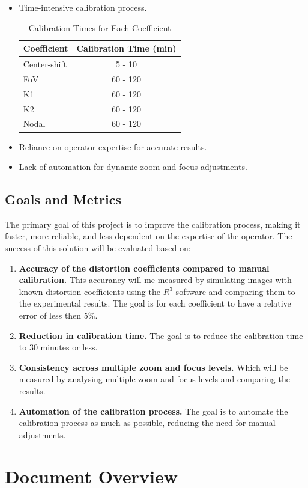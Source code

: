 \begin{itemize}
    \item Time-intensive calibration process.
    

    \begin{table}[h]
        \centering
        \begin{tabular}{|l|c|}
            \hline
            \textbf{Coefficient} & \textbf{Calibration Time (min)} \\ \hline
            Center-shift & 5 - 10 \\ \hline
            FoV & 60 - 120 \\ \hline
            K1 & 60 - 120 \\ \hline
            K2 & 60 - 120 \\ \hline
            Nodal & 60 - 120 \\ \hline
        \end{tabular}
        \caption{Calibration Times for Each Coefficient}
        \label{tab:calibration_times}
    \end{table}

    \item Reliance on operator expertise for accurate results.
    \item Lack of automation for dynamic zoom and focus adjustments.
\end{itemize}

\subsection{Goals and Metrics}

\noindent The primary goal of this project is to improve the calibration process, making it faster, more reliable, and less dependent on the expertise of the operator. The success of this solution will be evaluated based on:

\begin{enumerate}
    \item \textbf{Accuracy of the distortion coefficients compared to manual calibration.} This accurancy will me measured by simulating images with known distortion coefficients using the $R^3$ software and comparing them to the experimental results. The goal is for each coefficient to have a relative error of less then 5\%.
    \item \textbf{Reduction in calibration time.} The goal is to reduce the calibration time to 30 minutes or less.
    \item \textbf{Consistency across multiple zoom and focus levels.} Which will be measured by analysing multiple zoom and focus levels and comparing the results.
    \item \textbf{Automation of the calibration process.} The goal is to automate the calibration process as much as possible, reducing the need for manual adjustments.
\end{enumerate}

\section{Document Overview}\label{sec:doc_overview}
